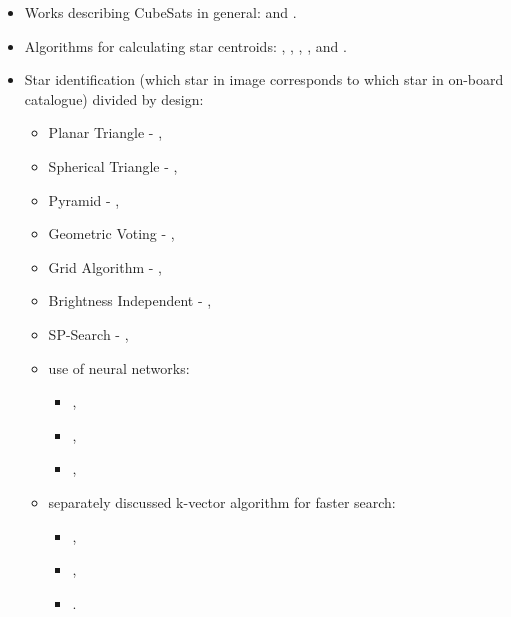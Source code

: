 \documentclass[12pt,a4paper,oneside]{article}
\begin{document}
\begin{itemize}[noitemsep]
\item Works describing CubeSats in general: \citet{swartwout2011brief} and \citet{heidt2000cubesat}.

\item Algorithms for calculating star centroids: \citet{liebe2002accuracy}, \citet{samaan2002predictive}, \citet{knutson2012fast}, \citet{azizabadi2014vlsi}, \citet{lindh2014development} and \citet{zhang2014brightness}. 

\item Star identification (which star in image corresponds to which star in on-board catalogue) divided by design:
\begin{itemize}[noitemsep]
\item Planar Triangle - \citet{cole2006fast}, 
\item Spherical Triangle - \citet{cole2004fast}, 
\item Pyramid - \citet{mortari2004pyramid}, 
\item Geometric Voting - \citet{kolomenkin2008geometric}, 
\item Grid Algorithm - \citet{padgett1997grid}, 
\item Brightness Independent -  \citet{dong2006brightness},
\item SP-Search - \citet{mortari1999sp}, 
\item use of neural networks: 
\begin{itemize}[noitemsep]
\item \citet{miri2012star}, 
\item \citet{lindbladstar},
\item \citet{li2003star}, 
\end{itemize}
\item separately discussed k-vector algorithm for faster search:
\begin{itemize}[noitemsep]
\item \citet{mortari1996fast}, 
\item \citet{mortari2000k},
\item \citet{mortari2013k}. 
\end{itemize}
\end{itemize}


\end{itemize}
\end{document}
